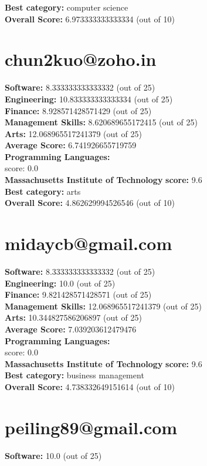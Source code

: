 \documentclass{article}
\begin{document}
\textbf{Best category: } computer science\\
\textbf{Overall Score: }6.973333333333334 (out of 10)\section{chun2kuo@zoho.in}
\textbf{Software:} 8.333333333333332 (out of 25)\\
\textbf{Engineering: } 10.833333333333334 (out of 25)\\
\textbf{Finance:} 8.928571428571429 (out of 25)\\
\textbf{Management Skills:} 8.620689655172415 (out of 25)\\
\textbf{Arts:} 12.068965517241379 (out of 25)\\
\textbf{Average Score: } 6.741926655719759\\
\textbf{Programming Languages:} \\
score: 0.0\\
\textbf{Massachusetts Institute of Technology} \textbf{score:} 9.6\\
\textbf{Best category: } arts\\
\textbf{Overall Score: }4.862629994526546 (out of 10)\section{midaycb@gmail.com}
\textbf{Software:} 8.333333333333332 (out of 25)\\
\textbf{Engineering: } 10.0 (out of 25)\\
\textbf{Finance:} 9.821428571428571 (out of 25)\\
\textbf{Management Skills:} 12.068965517241379 (out of 25)\\
\textbf{Arts:} 10.344827586206897 (out of 25)\\
\textbf{Average Score: } 7.039203612479476\\
\textbf{Programming Languages:} \\
score: 0.0\\
\textbf{Massachusetts Institute of Technology} \textbf{score:} 9.6\\
\textbf{Best category: } business management\\
\textbf{Overall Score: }4.738332649151614 (out of 10)\section{peiling89@gmail.com}
\textbf{Software:} 10.0 (out of 25)\\
\end{document}
